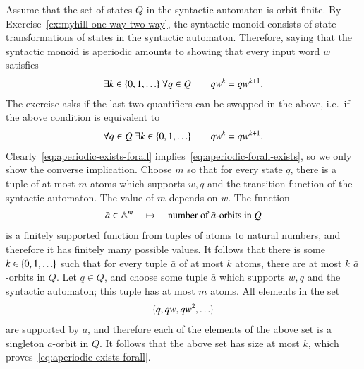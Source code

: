 {
	Assume that the set of states $Q$ in the syntactic automaton is orbit-finite. 
	By Exercise~\ref{ex:myhill-one-way-two-way}, the syntactic monoid consists of state transformations of states in the syntactic automaton. Therefore, saying that the syntactic monoid is aperiodic amounts to showing that every input word $w$ satisfies
	\begin{align}\label{eq:aperiodic-exists-forall}
		 \exists k \in \{0,1,\ldots\}\ \forall q \in Q \qquad qw^k = qw^{k+1}.
	\end{align}
	The exercise asks if the last two quantifiers can be swapped in the above, i.e.~if the above condition is equivalent to
	\begin{align}\label{eq:aperiodic-forall-exists}
		 \forall q \in Q \ \exists k \in \{0,1,\ldots\} \qquad qw^k = qw^{k+1}.
	\end{align}
	Clearly~\eqref{eq:aperiodic-exists-forall} implies~\eqref{eq:aperiodic-forall-exists}, so we only show the converse implication. Choose $m$ so that for every state $q$, there is a tuple of at most $m$ atoms which supports $w,q$ and the transition function of the syntactic automaton. The value of $m$ depends on $w$. The function
	\begin{align*}
		\bar a \in \mathbb A^m \quad \mapsto \quad \text{number of $\bar a$-orbits in $Q$}
	\end{align*}
	is a finitely supported function from tuples of atoms to natural numbers, and therefore it has finitely many possible values. It follows that there is some $k \in \{0,1,\ldots\}$ such that for every tuple $\bar a$ of at most $k$ atoms, there are at most $k$ $\bar a$-orbits in $Q$. 	Let $q \in Q$, and choose some tuple $\bar a$ which supports $w,q$ and the syntactic automaton; this tuple has at most $m$ atoms. All elements in the set 
	\begin{align*}
		\{q, qw, qw^2,\ldots\}
	\end{align*}
	are supported by $\bar a$, and therefore each of the elements of the above set is a singleton $\bar a$-orbit in $Q$. It follows that the above set has size at most $k$, which proves~\eqref{eq:aperiodic-exists-forall}.
}

